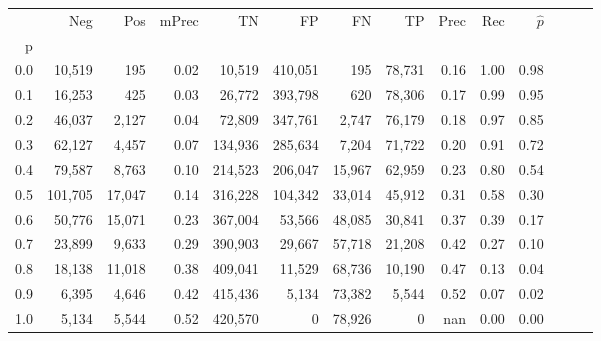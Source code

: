 \begin{tabular}{rrrrrrrrrrrrrr}
\toprule
{} &      Neg &     Pos & mPrec &       TN &       FP &      FN &      TP &  Prec &   Rec & $\hat{p}$ \\
p   &          &         &       &          &          &         &         &       &       &           \\
\midrule
0.0 &   10,519 &     195 &  0.02 &   10,519 &  410,051 &     195 &  78,731 &  0.16 &  1.00 &      0.98 \\
0.1 &   16,253 &     425 &  0.03 &   26,772 &  393,798 &     620 &  78,306 &  0.17 &  0.99 &      0.95 \\
0.2 &   46,037 &   2,127 &  0.04 &   72,809 &  347,761 &   2,747 &  76,179 &  0.18 &  0.97 &      0.85 \\
0.3 &   62,127 &   4,457 &  0.07 &  134,936 &  285,634 &   7,204 &  71,722 &  0.20 &  0.91 &      0.72 \\
0.4 &   79,587 &   8,763 &  0.10 &  214,523 &  206,047 &  15,967 &  62,959 &  0.23 &  0.80 &      0.54 \\
0.5 &  101,705 &  17,047 &  0.14 &  316,228 &  104,342 &  33,014 &  45,912 &  0.31 &  0.58 &      0.30 \\
0.6 &   50,776 &  15,071 &  0.23 &  367,004 &   53,566 &  48,085 &  30,841 &  0.37 &  0.39 &      0.17 \\
0.7 &   23,899 &   9,633 &  0.29 &  390,903 &   29,667 &  57,718 &  21,208 &  0.42 &  0.27 &      0.10 \\
0.8 &   18,138 &  11,018 &  0.38 &  409,041 &   11,529 &  68,736 &  10,190 &  0.47 &  0.13 &      0.04 \\
0.9 &    6,395 &   4,646 &  0.42 &  415,436 &    5,134 &  73,382 &   5,544 &  0.52 &  0.07 &      0.02 \\
1.0 &    5,134 &   5,544 &  0.52 &  420,570 &        0 &  78,926 &       0 &   nan &  0.00 &      0.00 \\
\bottomrule
\end{tabular}
